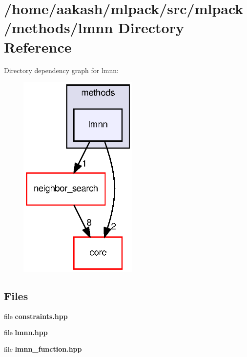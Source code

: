 \section{/home/aakash/mlpack/src/mlpack/methods/lmnn Directory Reference}
\label{dir_bbdae2525364378d931370e357a32610}
Directory dependency graph for lmnn\+:
\nopagebreak
\begin{figure}[H]
\begin{center}
\leavevmode
\includegraphics[width=167pt]{dir_bbdae2525364378d931370e357a32610_dep}
\end{center}
\end{figure}
\subsection*{Files}
\begin{DoxyCompactItemize}
\item 
file \textbf{ constraints.\+hpp}
\item 
file \textbf{ lmnn.\+hpp}
\item 
file \textbf{ lmnn\+\_\+function.\+hpp}
\end{DoxyCompactItemize}
